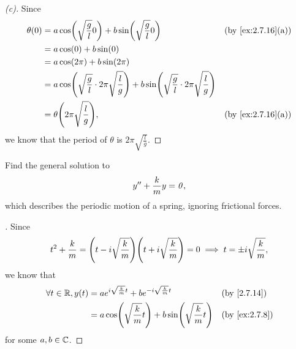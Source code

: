 \begin{proof}[(c)]
  Since
  \begin{align*}
    \theta(0) & = a \cos\pa{\sqrt{\frac{g}{l}} 0} + b \sin\pa{\sqrt{\frac{g}{l}} 0}                                                            &  & \text{(by \cref{ex:2.7.16}(a))} \\
              & = a \cos(0) + b \sin(0)                                                                                                                                             \\
              & = a \cos(2 \pi) + b \sin(2 \pi)                                                                                                                                     \\
              & = a \cos\pa{\sqrt{\frac{g}{l}} \cdot 2 \pi \sqrt{\frac{l}{g}}} + b \sin\pa{\sqrt{\frac{g}{l}}  \cdot 2 \pi \sqrt{\frac{l}{g}}}                                      \\
              & = \theta\pa{2 \pi \sqrt{\frac{l}{g}}},                                                                                         &  & \text{(by \cref{ex:2.7.16}(a))}
  \end{align*}
  we know that the period of \(\theta\) is \(2 \pi \sqrt{\frac{l}{g}}\).
\end{proof}

\begin{ex}\label{ex:2.7.17}
  Find the general solution to
  \[
    y'' + \frac{k}{m} y = \mathit{0},
  \]
  which describes the periodic motion of a spring, ignoring frictional forces.
\end{ex}

\begin{proof}[]
  Since
  \[
    t^2 + \frac{k}{m} = \pa{t - i \sqrt{\frac{k}{m}}} \pa{t + i \sqrt{\frac{k}{m}}} = 0 \implies t = \pm i \sqrt{\frac{k}{m}},
  \]
  we know that
  \begin{align*}
    \forall t \in \R, y(t) & = a e^{i \sqrt{\frac{k}{m}} t} + b e^{-i \sqrt{\frac{k}{m}} t}      &  & \text{(by \cref{2.7.14})}   \\
                           & = a \cos\pa{\sqrt{\frac{k}{m}} t} + b \sin\pa{\sqrt{\frac{k}{m}} t} &  & \text{(by \cref{ex:2.7.8})}
  \end{align*}
  for some \(a, b \in \mathbb{C}\).
\end{proof}
